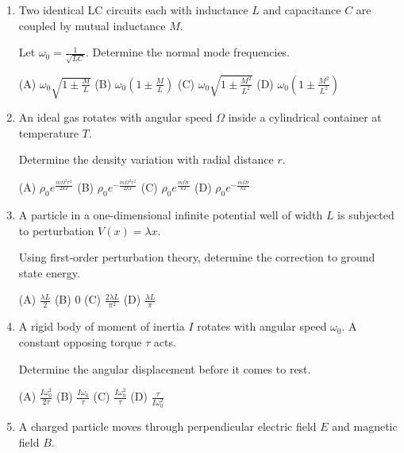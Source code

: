 \documentclass[12pt]{article}
\begin{document}
\begin{enumerate}[label=\arabic*., leftmargin=0pt, itemindent=18pt, itemsep=1em]
(A) $\frac{3\pi\beta}{k a^3}$  
(B) $-\frac{3\pi\beta}{k a^3}$  
(C) $\frac{2\pi\beta}{k a^3}$  
(D) $-\frac{2\pi\beta}{k a^3}$

\item Two identical LC circuits each with inductance $L$ and capacitance $C$ are coupled by mutual inductance $M$.

Let $\omega_0=\frac{1}{\sqrt{LC}}$. Determine the normal mode frequencies.

(A) $\omega_0\sqrt{1\pm\frac{M}{L}}$  
(B) $\omega_0\left(1\pm\frac{M}{L}\right)$  
(C) $\omega_0\sqrt{1\pm\frac{M^2}{L^2}}$  
(D) $\omega_0\left(1\pm\frac{M^2}{L^2}\right)$

\item An ideal gas rotates with angular speed $\Omega$ inside a cylindrical container at temperature $T$.

Determine the density variation with radial distance $r$.

(A) $\rho_0 e^{\frac{m\Omega^2 r^2}{2kT}}$  
(B) $\rho_0 e^{-\frac{m\Omega^2 r^2}{2kT}}$  
(C) $\rho_0 e^{\frac{m\Omega r}{kT}}$  
(D) $\rho_0 e^{-\frac{m\Omega r}{kT}}$

\item A particle in a one-dimensional infinite potential well of width $L$ is subjected to perturbation $V(x)=\lambda x$.

Using first-order perturbation theory, determine the correction to ground state energy.

(A) $\frac{\lambda L}{2}$  
(B) $0$  
(C) $\frac{2\lambda L}{\pi^2}$  
(D) $\frac{\lambda L}{\pi}$

\item A rigid body of moment of inertia $I$ rotates with angular speed $\omega_0$. A constant opposing torque $\tau$ acts.

Determine the angular displacement before it comes to rest.

(A) $\frac{I\omega_0^2}{2\tau}$  
(B) $\frac{I\omega_0}{\tau}$  
(C) $\frac{I\omega_0^2}{\tau}$  
(D) $\frac{\tau}{I\omega_0^2}$

\item A charged particle moves through perpendicular electric field $E$ and magnetic field $B$.


\end{enumerate}
\end{document}
